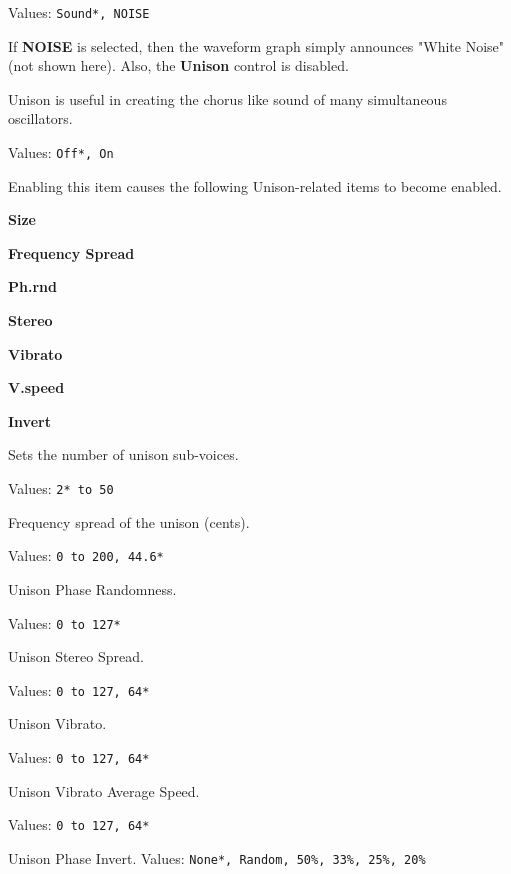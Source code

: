    Values: \texttt{Sound*, NOISE}

   If \textbf{NOISE} is selected, then the waveform graph simply announces
   "White Noise" (not shown here).  Also, the \textbf{Unison} control is
   disabled.

   Unison is useful in creating the chorus like sound of many simultaneous
   oscillators.

   Values: \texttt{Off*, On}

   Enabling this item causes the following Unison-related items to become
   enabled.

      \begin{enumber}
         \item \textbf{Size}
         \item \textbf{Frequency Spread}
         \item \textbf{Ph.rnd}
         \item \textbf{Stereo}
         \item \textbf{Vibrato}
         \item \textbf{V.speed}
         \item \textbf{Invert}
      \end{enumber}

   \setcounter{ItemCounter}{0}      %

   Sets the number of unison sub-voices.

   Values: \texttt{2* to 50}

   Frequency spread of the unison (cents).

   Values: \texttt{0 to 200, 44.6*}

   Unison Phase Randomness.

   Values: \texttt{0 to 127*}

   Unison Stereo Spread.

   Values: \texttt{0 to 127, 64*}

   Unison Vibrato.

   Values: \texttt{0 to 127, 64*}

   Unison Vibrato Average Speed.

   Values: \texttt{0 to 127, 64*}

   Unison Phase Invert.
   Values: \texttt{None*, Random, 50\%, 33\%, 25\%, 20\%}

